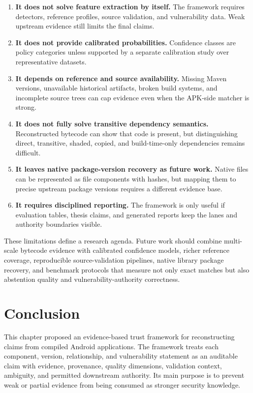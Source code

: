 \begin{enumerate}
  \item \textbf{It does not solve feature extraction by itself.} The framework
  requires detectors, reference profiles, source validation, and vulnerability
  data. Weak upstream evidence still limits the final claims.

  \item \textbf{It does not provide calibrated probabilities.} Confidence
  classes are policy categories unless supported by a separate calibration
  study over representative datasets.

  \item \textbf{It depends on reference and source availability.} Missing
  Maven versions, unavailable historical artifacts, broken build systems, and
  incomplete source trees can cap evidence even when the APK-side matcher is
  strong.

  \item \textbf{It does not fully solve transitive dependency semantics.}
  Reconstructed bytecode can show that code is present, but distinguishing
  direct, transitive, shaded, copied, and build-time-only dependencies remains
  difficult.

  \item \textbf{It leaves native package-version recovery as future work.}
  Native files can be represented as file components with hashes, but mapping
  them to precise upstream package versions requires a different evidence
  base.

  \item \textbf{It requires disciplined reporting.} The framework is only
  useful if evaluation tables, thesis claims, and generated reports keep the
  lanes and authority boundaries visible.
\end{enumerate}

These limitations define a research agenda. Future work should combine
multi-scale bytecode evidence with calibrated confidence models, richer
reference coverage, reproducible source-validation pipelines, native library
package recovery, and benchmark protocols that measure not only exact matches
but also abstention quality and vulnerability-authority correctness.

\section{Conclusion}

This chapter proposed an evidence-based trust framework for reconstructing
\SBOM claims from compiled Android applications. The framework treats each
component, version, relationship, and vulnerability statement as an auditable
claim with evidence, provenance, quality dimensions, validation context,
ambiguity, and permitted downstream authority. Its main purpose is to prevent
weak or partial evidence from being consumed as stronger security knowledge.

